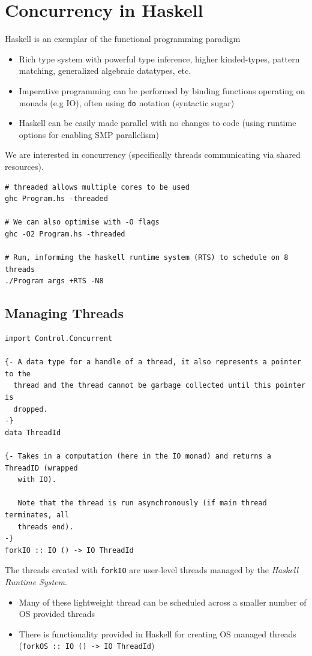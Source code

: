 \chapter{Concurrency in Haskell}
Haskell is an exemplar of the functional programming paradigm
\begin{itemize}
    \item Rich type system with powerful type inference, higher kinded-types, pattern matching, generalized algebraic datatypes, etc.
    \item Imperative programming can be performed by binding functions operating on monads (e.g IO), often using \texttt{do} notation (syntactic sugar)
    \item Haskell can be easily made parallel with no changes to code (using runtime options for enabling SMP parallelism)
\end{itemize}
We are interested in concurrency (specifically threads communicating via shared resources).
\begin{verbatim}
# threaded allows multiple cores to be used
ghc Program.hs -threaded

# We can also optimise with -O flags 
ghc -O2 Program.hs -threaded

# Run, informing the haskell runtime system (RTS) to schedule on 8 threads
./Program args +RTS -N8
\end{verbatim}

\section{Managing Threads}
\begin{verbatim}
import Control.Concurrent

{- A data type for a handle of a thread, it also represents a pointer to the 
  thread and the thread cannot be garbage collected until this pointer is 
  dropped. 
-}
data ThreadId

{- Takes in a computation (here in the IO monad) and returns a ThreadID (wrapped 
   with IO).

   Note that the thread is run asynchronously (if main thread terminates, all 
   threads end).
-}
forkIO :: IO () -> IO ThreadId
\end{verbatim}
The threads created with \texttt{forkIO} are user-level threads managed by the \textit{Haskell Runtime System}.
\begin{itemize}
    \item Many of these lightweight thread can be scheduled across a smaller number of OS provided threads
    \item There is functionality provided in Haskell for creating OS managed threads (\texttt{forkOS :: IO () -> IO ThreadId})
\end{itemize}

